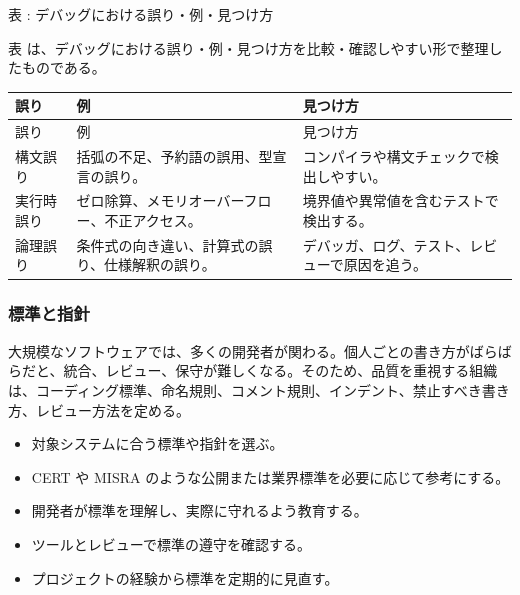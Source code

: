 \par\smallskip\noindent{}\label{tab:ch16-15}表 \thetable: デバッグにおける誤り・例・見つけ方\par\smallskip
表 \thetable は、デバッグにおける誤り・例・見つけ方を比較・確認しやすい形で整理したものである。\par\smallskip
\begin{longtable}{>{\raggedright\arraybackslash}p{}>{\raggedright\arraybackslash}p{}>{\raggedright\arraybackslash}p{}}
\toprule
誤り & 例 & 見つけ方 \\
\midrule
\endfirsthead
\toprule
誤り & 例 & 見つけ方 \\
\midrule
\endhead
構文誤り & 括弧の不足、予約語の誤用、型宣言の誤り。 & コンパイラや構文チェックで検出しやすい。 \\
実行時誤り & ゼロ除算、メモリオーバーフロー、不正アクセス。 & 境界値や異常値を含むテストで検出する。 \\
論理誤り & 条件式の向き違い、計算式の誤り、仕様解釈の誤り。 & デバッガ、ログ、テスト、レビューで原因を追う。 \\
\bottomrule
\end{longtable}

\subsubsection{標準と指針}

大規模なソフトウェアでは、多くの開発者が関わる。個人ごとの書き方がばらばらだと、統合、レビュー、保守が難しくなる。そのため、品質を重視する組織は、コーディング標準、命名規則、コメント規則、インデント、禁止すべき書き方、レビュー方法を定める。

\begin{itemize}[leftmargin=2em]
\item 対象システムに合う標準や指針を選ぶ。
\item CERT や MISRA のような公開または業界標準を必要に応じて参考にする。
\item 開発者が標準を理解し、実際に守れるよう教育する。
\item ツールとレビューで標準の遵守を確認する。
\item プロジェクトの経験から標準を定期的に見直す。
\end{itemize}
